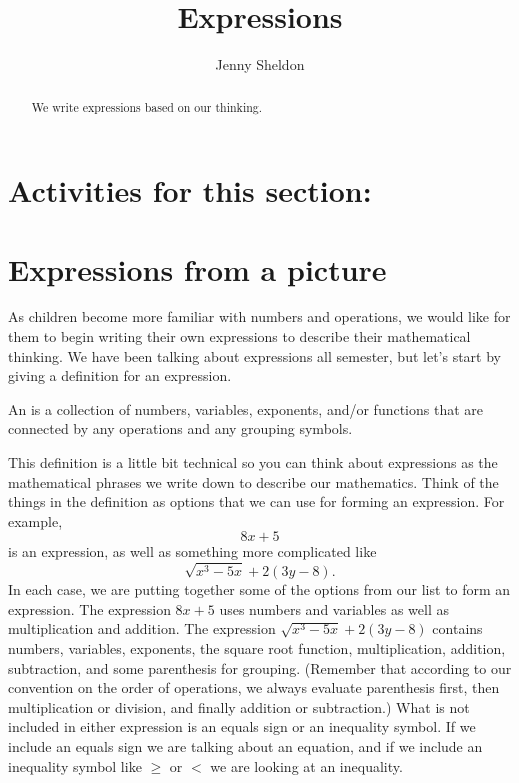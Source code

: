 \documentclass{ximera}
\title{Expressions}
\author{Jenny Sheldon}
\begin{document}
\begin{abstract}
We write expressions based on our thinking.
\end{abstract}
\maketitle

\section{Activities for this section:} 

\section{Expressions from a picture}

As children become more familiar with numbers and operations, we would like for them to begin writing their own expressions to describe their mathematical thinking. We have been talking about expressions all semester, but let's start by giving a definition for an expression.

\begin{definition}
An  is a collection of numbers, variables, exponents, and/or functions that are connected by any operations and any grouping symbols.
\end{definition}
This definition is a little bit technical so you can think about expressions as the mathematical phrases we write down to describe our mathematics. Think of the things in the definition as options that we can use for forming an expression. For example, 
\[
8x + 5
\]
is an expression, as well as something more complicated like
\[
\sqrt{x^3 - 5x} + 2(3y - 8).
\]
In each case, we are putting together some of the options from our list to form an expression. The expression $8x+5$ uses numbers and variables as well as multiplication and addition. The expression $\sqrt{x^3 - 5x} + 2(3y - 8)$ contains numbers, variables, exponents, the square root function, multiplication, addition, subtraction, and some parenthesis for grouping. (Remember that according to our convention on the order of operations, we always evaluate parenthesis first, then multiplication or division, and finally addition or subtraction.) What is not included in either expression is an equals sign or an inequality symbol. If we include an equals sign we are talking about an equation, and if we include an inequality symbol like $\geq$ or $<$ we are looking at an inequality.
\end{document}
